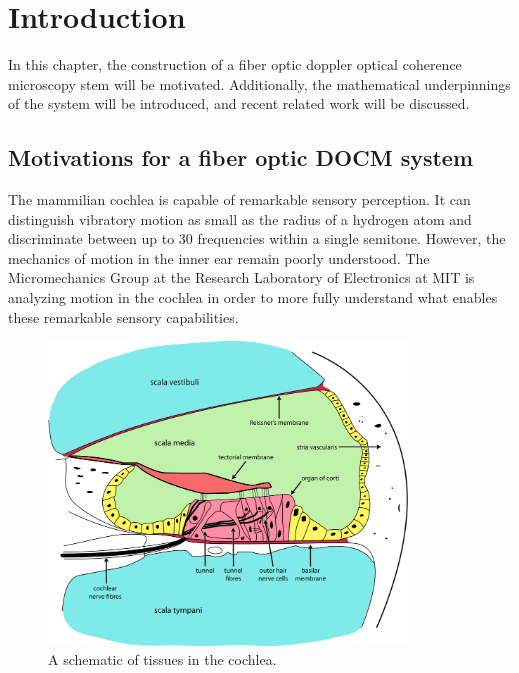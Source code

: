 \chapter{Introduction}

In this chapter, the construction of a fiber optic doppler optical coherence microscopy stem will be motivated. Additionally, the mathematical underpinnings of the system will be introduced, and recent related work will be discussed.

\section{Motivations for a fiber optic DOCM system}

\label{sec:intro}

The mammilian cochlea is capable of remarkable sensory perception. It can distinguish vibratory motion as small as the radius of a hydrogen atom and discriminate between up to 30 frequencies within a single semitone. \cite{ghafarri} However, the mechanics of motion in the inner ear remain poorly understood. The Micromechanics Group at the Research Laboratory of Electronics at MIT is analyzing motion in the cochlea in order to more fully understand what enables these remarkable sensory capabilities.

\begin{figure}[h!]
  \centering
    \includegraphics[width=0.85\textwidth]{Images/Background/cochlea_big.png}
      \caption{A schematic of tissues in the cochlea.}
      \label{fig:cochlea}
\end{figure}

